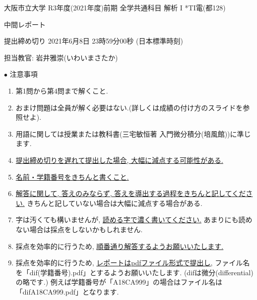 \documentclass[dvipdfmx,a4paper,11pt]{article}
\theoremstyle{definition}
\begin{document}
\begin{center}
{ \large 大阪市立大学 R3年度(2021年度)前期 全学共通科目 解析 I *TI電(都128)} \\
\vspace{5pt}

{\LARGE 中間レポート } \\
\vspace{5pt}

{ \Large 提出締め切り 2021年6月8日 23時59分00秒 (日本標準時刻)}
\end{center}

\begin{flushright}
 担当教官: 岩井雅崇(いわいまさたか) 
\end{flushright}

{\Large $\bullet$ 注意事項}
\begin{enumerate}
\item 第1問から第4問まで解くこと. 
\item おまけ問題は全員が解く必要はない.(詳しくは成績の付け方のスライドを参照せよ).
\item 用語に関しては授業または教科書(三宅敏恒著 入門微分積分(培風館))に準じます.
\item \underline{提出締め切りを遅れて提出した場合, 大幅に減点する可能性がある.}
\item \underline{名前・学籍番号をきちんと書くこと.}
\item \underline{解答に関して, 答えのみならず, 答えを導出する過程をきちんと記してください.} きちんと記していない場合は大幅に減点する場合がある.
\item 字は汚くても構いませんが, \underline{読める字で濃く書いてください.} あまりにも読めない場合は採点をしないかもしれません.%
\item 採点を効率的に行うため, \underline{順番通り解答するようお願いいたします.}
\item 採点を効率的に行うため,  \underline{レポートはpdfファイル形式で提出し,} ファイル名を「dif(学籍番号).pdf」とするようお願いいたします. 
(difは微分(differential)の略です.)
例えば学籍番号が「A18CA999」の場合はファイル名は「difA18CA999.pdf」となります.
\end{enumerate}
\end{document}
